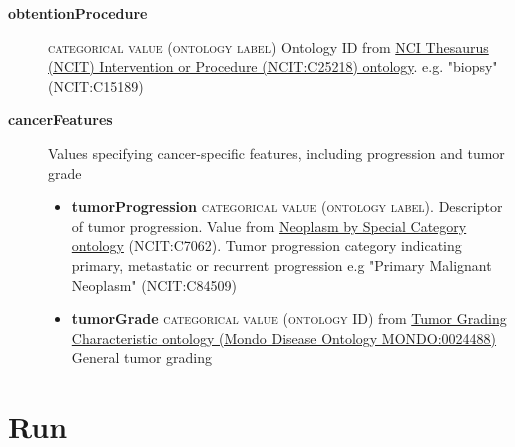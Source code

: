 \documentclass[a4paper, 10pt]{article}        %
\begin{document}
\begin{description}
\begin{itemize}
	\end{itemize}
	\item[\textbf{obtentionProcedure}] {\textsc{categorical value (ontology label)}} Ontology ID from \href{http://purl.obolibrary.org/obo/NCIT_C25218}{NCI Thesaurus (NCIT) Intervention or Procedure (NCIT:C25218) ontology}. e.g. "biopsy" (NCIT:C15189) %
	\item[\textbf{cancerFeatures}] Values specifying cancer-specific features, including progression and tumor grade
	\begin{itemize}
			\item[] \textbf{tumorProgression} {\textsc{categorical value (ontology label)}}. Descriptor of tumor progression. Value from \href{https://www.ebi.ac.uk/ols/ontologies/ncit/terms?iri=http%3A%2F%2Fpurl.obolibrary.org%2Fobo%2FNCIT_C7062&viewMode=All&siblings=false}{Neoplasm by Special Category ontology} (NCIT:C7062). Tumor progression category indicating primary, metastatic or recurrent progression  e.g "Primary Malignant Neoplasm" (NCIT:C84509)
			\item[] \textbf{tumorGrade} {\textsc{categorical value (ontology ID)}} from \href{https://www.ebi.ac.uk/ols/ontologies/mondo/terms?iri=http%3A%2F%2Fpurl.obolibrary.org%2Fobo%2FMONDO_0024488}{Tumor Grading Characteristic ontology (Mondo Disease Ontology MONDO:0024488)} General tumor grading  	
\end{itemize} 
 \end{description}
 


   \section*{ {\color{teal} Run}}
  
\end{document}
